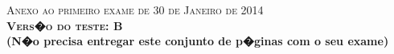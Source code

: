 \documentclass{docist}
\begin{document}
\thispagestyle{empty}

\begin{center}
  {\Large \textsc{Anexo ao primeiro exame de 30 de Janeiro de 2014\\[2ex]
      \textbf{Vers�o do teste: B}\\[2ex]}}
  {\normalsize  \textbf{(N�o precisa entregar este conjunto de p�ginas com o seu exame)}}
\end{center}



\qMWLowCost

\qMWTactics

\qMWReliabilityImplementation

\qMWReliabilityReadsTactic

\qMWVerBlobTactic

\qInternationalizationTactics

\qIdentityMap

\qGPCarbonBufferInterface

\qGPCCView

\qGPComposerUIPerformance

\qAvailabilityDefensive

\qObserverUses

\qUsesLayers

\qGMRestInteroperability

\qGMPipesFilters

\qGMDataModel

\qGMPerformance

\qGMReliabilityBounce

\qGMSwitchboard

\qSeveralStylesView

\qApplyUses

\qCHQualities

\qCHPerformanceQualityTwo

\qCHAmazonSilk

\qCHRenderStyle

\qCHPrerenderTactics

\qCHOmniboxQualities

\qFenixThree

\qFenixOne

\qEnterpriseWide
\end{document}
